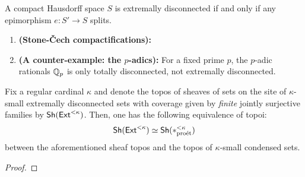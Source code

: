                 \begin{definition} \label{def: extrememly_disconnected_sets}
                    A compact Hausdorff space $S$ is extremally disconnected if and only if any epimorphism $e: S' \to S$ splits.
                \end{definition}
                \begin{example}
                    \noindent
                    \begin{enumerate}
                        \item \textbf{(Stone-\v{C}ech compactifications):}
                        \item \textbf{(A counter-example: the $p$-adics):} For a fixed prime $p$, the $p$-adic rationals $\mathbb{Q}_p$ is only totally disconnected, not extremally disconnected. 
                    \end{enumerate}
                \end{example}
                
                \begin{lemma} \label{lemma: small_condensed_sets_and_extremally_disconnected_sets}
                    Fix a regular cardinal $\kappa$ and denote the topos of sheaves of sets on the site of $\kappa$-small extremally disconnected sets with coverage given by \textit{finite} jointly surjective families by $\mathsf{Sh}(\mathsf{Ext}^{< \kappa})$. Then, one has the following equivalence of topoi:
                        $$\mathsf{Sh}(\mathsf{Ext}^{< \kappa}) \simeq \mathsf{Sh}(*_{\mathrm{pro\acute{e}t}}^{< \kappa})$$
                    between the aforementioned sheaf topos and the topos of $\kappa$-small condensed sets.
                \end{lemma}
                    \begin{proof}
                        
                    \end{proof}
                    
